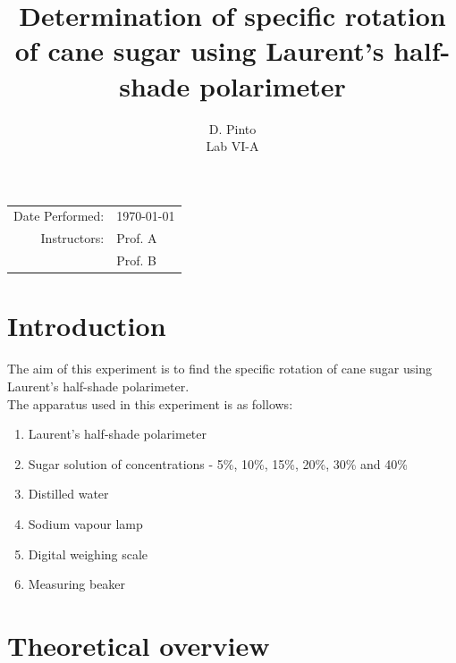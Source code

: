\documentclass{dkpinto-report}
\title{\bfseries Determination of specific rotation of cane sugar using Laurent's half-shade polarimeter} %
\author{D. Pinto \\ Lab VI-A}        %
\date{\vspace{-5ex}}                 %
\begin{document}
\begin{titlepage}
\maketitle 

\begin{center}           %
\begin{tabular}{r l}     %
Date Performed: & \today \\ 
Instructors: & Prof. A \\  
             & Prof. B
\end{tabular}
\end{center}


\tableofcontents  %
\thispagestyle{empty}  %

\end{titlepage}



\section{Introduction} %
The aim of this experiment is to find the specific rotation of cane sugar using Laurent's half-shade polarimeter.\\
The apparatus used in this experiment is as follows:

\begin{enumerate}  %
\item Laurent's half-shade polarimeter
\item Sugar solution of concentrations - 5\%, 10\%, 15\%, 20\%, 30\% and 40\%  %
\item Distilled water
\item Sodium vapour lamp
\item Digital weighing scale
\item Measuring beaker   
\end{enumerate}



\section{Theoretical overview}
\end{document}
